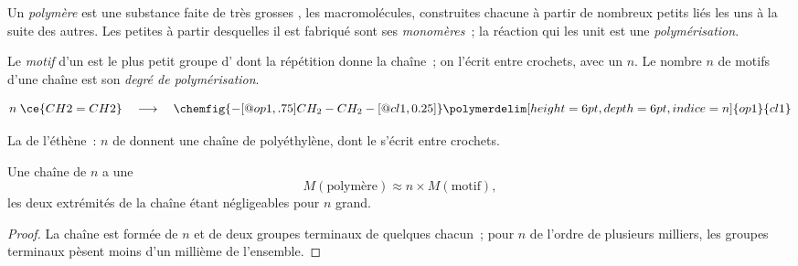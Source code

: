 \begin{definition}\label{def:g12:polymers:polymer}
Un \emph{polymère} est une substance faite de très
grosses , les macromolécules, construites chacune à partir de
nombreux petits  liés les uns à la suite des autres. Les petites
 à partir desquelles il est fabriqué sont ses
\emph{monomères}~; la réaction qui les unit est une
\emph{polymérisation}.
\end{definition}

\begin{definition}\label{def:g12:polymers:repeat-unit}
Le \emph{motif} d'un  est le plus petit groupe
d' dont la répétition donne la chaîne~; on l'écrit entre crochets,
avec un  $n$. Le nombre $n$ de motifs d'une chaîne est son
\emph{degré de polymérisation}.
\end{definition}

\begin{omfigure}
\[
  n\;\ce{CH2=CH2}
  \quad\longrightarrow\quad
  \chemfig{-[@{op1,.75}]CH_2-CH_2-[@{cl1,0.25}]}
  \polymerdelim[height=6pt, depth=6pt, indice=n]{op1}{cl1}
\]

{\small La  de l'éthène~: $n$  de  donnent
une chaîne de polyéthylène, dont le   s'écrit entre
crochets.}
\end{omfigure}

\begin{proposition}\label{prop:g12:polymers:molar-mass}
Une chaîne de  $n$ a une 
\[
  M(\text{polymère}) \approx n \times M(\text{motif}) ,
\]
les deux extrémités de la chaîne étant négligeables pour $n$ grand.
\end{proposition}

\begin{proof}
La chaîne est formée de $n$  et de deux groupes terminaux de
quelques  chacun~; pour $n$ de l'ordre de plusieurs milliers, les
groupes terminaux pèsent moins d'un millième de l'ensemble.
\end{proof}

